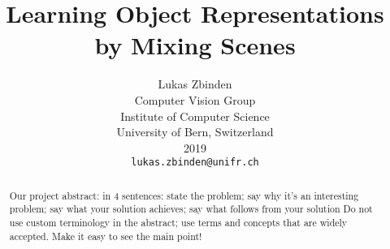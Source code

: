 \documentclass[12pt,a4paper]{article}
\begin{document}
\title{Learning Object Representations by Mixing Scenes}

\author{Lukas Zbinden\\
Computer Vision Group\\
Institute of Computer Science\\ 
University of Bern, Switzerland\\ 
2019\\
{\tt\small lukas.zbinden@unifr.ch}
}

\maketitle

\begin{abstract}
   Our project 
   abstract: in 4 sentences: state the problem; say why it's an interesting problem; say what your solution achieves; say what follows from your solution
   Do not use custom terminology in the abstract;
use terms and concepts that are widely accepted. Make it easy to see the main point!

\end{abstract}


\newpage
\tableofcontents
\newpage
\listoffigures
\newpage
\listoftables
\newpage

\end{document}
